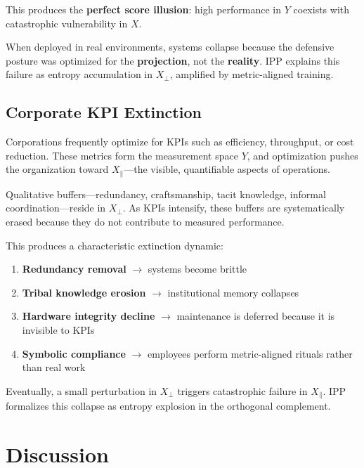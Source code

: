 \documentclass[11pt]{article}
\begin{document}
This produces the \textbf{perfect score illusion}:
high performance in $Y$ coexists with catastrophic vulnerability in $X$.

When deployed in real environments, systems collapse because the defensive posture was optimized for the \textbf{projection}, not the \textbf{reality}.
IPP explains this failure as entropy accumulation in $X_{\perp}$, amplified by metric-aligned training.

\subsection{Corporate KPI Extinction}

Corporations frequently optimize for KPIs such as efficiency, throughput, or cost reduction.
These metrics form the measurement space $Y$, and optimization pushes the organization toward $X_{\parallel}$---the visible, quantifiable aspects of operations.

Qualitative buffers---redundancy, craftsmanship, tacit knowledge, informal coordination---reside in $X_{\perp}$.
As KPIs intensify, these buffers are systematically erased because they do not contribute to measured performance.

This produces a characteristic extinction dynamic:

\begin{enumerate}[leftmargin=1.5em]
    \item \textbf{Redundancy removal} $\rightarrow$ systems become brittle
    \item \textbf{Tribal knowledge erosion} $\rightarrow$ institutional memory collapses
    \item \textbf{Hardware integrity decline} $\rightarrow$ maintenance is deferred because it is invisible to KPIs
    \item \textbf{Symbolic compliance} $\rightarrow$ employees perform metric-aligned rituals rather than real work
\end{enumerate}

Eventually, a small perturbation in $X_{\perp}$ triggers catastrophic failure in $X_{\parallel}$.
IPP formalizes this collapse as entropy explosion in the orthogonal complement.

\section{Discussion}
\end{document}
